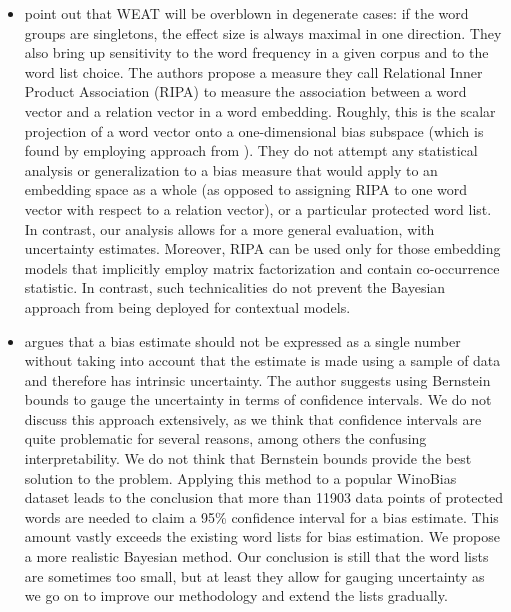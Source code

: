 \documentclass{clv3}
\begin{document}
\begin{itemize}
\item \citet{Ethayarajh2019understanding} point out that WEAT will be overblown in degenerate cases: if the word groups are singletons, the effect size is always maximal in one direction. They also bring up  sensitivity to the word frequency in a given corpus and to the word list choice. The authors propose a measure they call Relational Inner Product Association (RIPA) to measure the association between a word vector and a relation vector in  a  word embedding. Roughly, this is  the scalar projection of a word vector onto a one-dimensional bias subspace (which is found by employing approach from \citet{Bolukbasi2016man}). They do not attempt any statistical analysis or generalization to a bias measure that would apply to an embedding space as a whole (as opposed to assigning RIPA to one word vector with respect to a relation vector), or a particular protected word list. In contrast, our analysis allows for a more general evaluation, with uncertainty estimates. Moreover, RIPA can be used only for those embedding models that implicitly employ matrix factorization and contain co-occurrence statistic. In contrast, such technicalities do not prevent the Bayesian approach from being deployed for contextual models.

\item \citet{Ethayarajh2020Bernstein} argues that a bias estimate should not be expressed as a single number without taking into account that the estimate is
made using a sample of data and therefore has intrinsic uncertainty.
The author suggests using Bernstein bounds to gauge the uncertainty in
terms of confidence intervals. We do not discuss this approach
extensively, as we think that confidence intervals are quite
problematic for several reasons, among others the confusing
interpretability. We do not think that Bernstein bounds provide the
best solution to the problem. Applying this method to a popular
WinoBias dataset leads to the conclusion that more than 11903 data points of protected words 
are needed to claim a 95\% confidence interval for a bias estimate.
This amount vastly exceeds the existing word lists for bias
estimation. We propose a more realistic Bayesian method. Our
conclusion is still that the word lists are sometimes too small, but
at least they allow for gauging uncertainty as we go on to improve our
methodology and extend the lists gradually.




\end{itemize}
\end{document}
